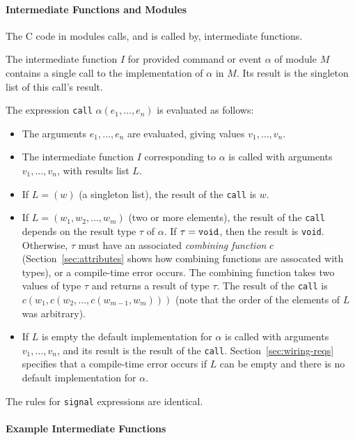 \documentclass[11pt,letterpaper]{article}
\newcommand{\kw}[1]{{\tt #1}}
\newcommand{\code}[1]{{\tt #1}}
\begin{document}
\paragraph{Intermediate Functions and Modules}

The C code in modules calls, and is called by, intermediate functions. 

The intermediate function $I$ for provided command or event $\alpha$ of
module $M$ contains a single call to the implementation of $\alpha$ in
$M$. Its result is the singleton list of this call's result.

The expression \code{call} $\alpha(e_1, \ldots, e_n)$ is evaluated as
follows:
\begin{itemize}
\item The arguments $e_1, \ldots, e_n$ are evaluated, giving values $v_1,
\ldots, v_n$.

\item The intermediate function $I$ corresponding to $\alpha$ is called
with arguments $v_1, \ldots, v_n$, with results list $L$.

\item If $L = (w)$ (a singleton list), the result of the \code{call}
is $w$.

\item If $L = (w_1, w_2, \ldots, w_m)$ (two or more elements), the result
of the \code{call} depends on the result type $\tau$ of $\alpha$. If $\tau
= \kw{void}$, then the result is \kw{void}. Otherwise, $\tau$ must have an
associated \emph{combining function} $c$ (Section~\ref{sec:attributes}
shows how combining functions are assocated with types), or a compile-time
error occurs. The combining function takes two values of type $\tau$ and
returns a result of type $\tau$. The result of the \kw{call} is $c(w_1,
c(w_2, \ldots, c(w_{m-1}, w_m)))$ (note that the order of the elements of 
$L$ was arbitrary).

\item If $L$ is empty the default implementation for $\alpha$ is
called with arguments $v_1, \ldots, v_n$, and its result is the result of
the \code{call}. Section~\ref{sec:wiring-reqs} specifies that a
compile-time error occurs if $L$ can be empty and there is no default
implementation for $\alpha$.
\end{itemize}
The rules for \code{signal} expressions are identical.

\paragraph{Example Intermediate Functions} 
\end{document}
